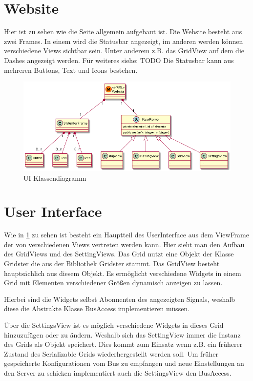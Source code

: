 \documentclass[entwurf.tex]{subfiles}
\begin{document}
  	\section{Website}
  	\label{Class:Website}
		Hier ist zu sehen wie die Seite allgemein aufgebaut ist. Die Website besteht aus zwei Frames. In einem wird die Statusbar angezeigt, im anderen werden können verschiedene Views sichtbar sein. Unter anderem z.B. das GridView auf dem die Dashes angezeigt werden. Für weiteres siehe: TODO %
Die Statusbar kann aus mehreren Buttons, Text und Icons bestehen.
		\begin{figure}[H]
  			\begin{center}
 				\includegraphics[width=\textwidth]{diagrams/website.png}
  				\caption{UI Klassendiagramm}
  			\end{center}
  		\end{figure}  	
  	
  	\newpage
  	\section{User Interface}
		Wie in \ref{Class:Website} zu sehen ist besteht ein Hauptteil des UserInterface aus dem ViewFrame der von verschiedenen Views vertreten werden kann. Hier sieht man den Aufbau des GridViews und des SettingViews. Das Grid nutzt eine Objekt der Klasse Gridster die aus der Bibliothek Gridster stammt. Das GridView besteht hauptsächlich aus diesem Objekt. Es ermöglicht verschiedene Widgets in einem Grid mit Elementen verschiedener Größen dynamisch anzeigen zu lassen.
		
		Hierbei sind die Widgets selbst Abonnenten des angezeigten Signals, weshalb diese die Abstrakte Klasse BusAccess implementieren müssen.
		
		Über die SettingsView ist es möglich verschiedene Widgets in dieses Grid hinzuzufügen oder zu ändern. Weshalb sich das SettingView immer die Instanz des Grids als Objekt speichert. Dies kommt zum Einsatz wenn z.B. ein früherer Zustand des Serializable Grids wiederhergestellt werden soll. Um früher gespeicherte Konfigurationen vom Bus zu empfangen und neue Einstellungen an den Server zu schicken implementiert auch die SettingsView den BusAccess. 
		
\end{document}
